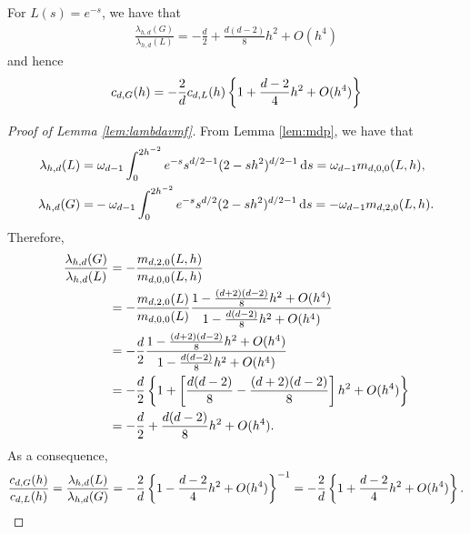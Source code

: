 \documentclass{article}
\begin{document}
\begin{lemma}\label{lem:lambdavmf}
For $L(s)=e^{-s}$, we have that
\begin{align*}
    \frac{\lambda_{h,d}(G)}{\lambda_{h,d}(L)}=-\frac{d}{2}+\frac{d(d-2)}{8}h^2+O(h^4)
\end{align*}
and hence
\begin{align*}
    c_{d,G}(h)=-\frac{2}{d}c_{d,L}(h)\left\{1+\frac{d-2}{4}h^2+O(h^4)\right\}
\end{align*}
\end{lemma}

\begin{proof}[Proof of Lemma \ref{lem:lambdavmf}]
From Lemma \ref{lem:mdp}, we have that
\begin{align*}
    \lambda_{h,d}(L)=&\;\omega_{d-1}\int_0^{2h^{-2}} e^{-s} s^{d/2-1}(2-sh^2)^{d/2-1}\,\mathrm{d} s=\omega_{d-1}m_{d,0,0}(L,h),\\
    \lambda_{h,d}(G)=&-\omega_{d-1}\int_0^{2h^{-2}} e^{-s} s^{d/2}(2-sh^2)^{d/2-1}\,\mathrm{d} s=-\omega_{d-1}m_{d,2,0}(L,h).
\end{align*}
Therefore,
\begin{align*}
\frac{\lambda_{h,d}(G)}{\lambda_{h,d}(L)}&=-\frac{m_{d,2,0}(L,h)}{m_{d,0,0}(L,h)}\\
&=-\frac{m_{d,2,0}(L)}{m_{d,0,0}(L)}\frac{1-\frac{(d+2)(d-2)}{8}h^2+O(h^{4})}{1-\frac{d(d-2)}{8}h^2+O(h^{4})}\\
&=-\frac{d}{2}\frac{1-\frac{(d+2)(d-2)}{8}h^2+O(h^{4})}{1-\frac{d(d-2)}{8}h^2+O(h^{4})}\\
&=-\frac{d}{2}\left\{1+\left[\frac{d(d-2)}{8}-\frac{(d+2)(d-2)}{8}\right]h^2+O(h^4)\right\}\\
&=-\frac{d}{2}+\frac{d(d-2)}{8}h^2+O(h^4).
\end{align*}
As a consequence,
\begin{align*}
\frac{c_{d,G}(h)}{c_{d,L}(h)}=\frac{\lambda_{h,d}(L)}{\lambda_{h,d}(G)}%
=-\frac{2}{d}\lrb{1-\frac{d-2}{4}h^2+O(h^4)}^{-1}%
=-\frac{2}{d}\lrb{1+\frac{d-2}{4}h^2+O(h^4)}.
\end{align*}
\end{proof}



\end{document}
